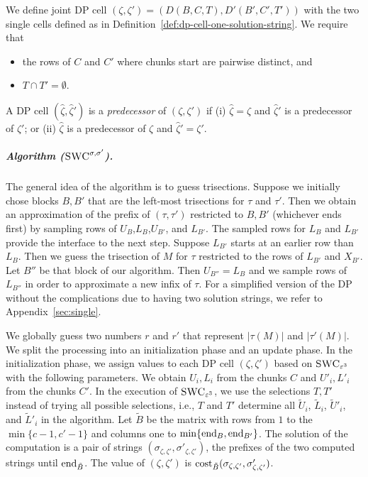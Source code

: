 \begin{definition}
    We define joint DP cell $(\zeta,\zeta') = (D(B,C,T), D'(B',C',T'))$ with the two single cells defined as in Definition~\ref{def:dp-cell-one-solution-string}. 
    We require that
    \begin{itemize}
        \item the rows of $C$ and $C'$ where chunks start are pairwise distinct, and
        \item $T \cap T' = \emptyset$.
    \end{itemize}
    \label{def:dp-cell-two-solution-string}
\end{definition}
\smallskip

\begin{definition}
    A DP cell $(\hat{\zeta}, \hat{\zeta}')$ is a \emph{predecessor} of $(\zeta, \zeta')$ if (i) $\hat{\zeta} = \zeta$ and $\hat{\zeta}'$ is a predecessor of $\zeta'$; or (ii) $\hat{\zeta}$ is a predecessor of $\zeta$ and $\hat{\zeta}' = \zeta'$.
    \label{def:predecessor-two}
\end{definition}

\subparagraph{Algorithm ($\textsc{SWC}^{\sigma, \sigma'}$).}
The general idea of the algorithm is to guess trisections.
Suppose we initially chose blocks $B,B'$ that are the left-most trisections for $\tau$ and $\tau'$.
Then we obtain an approximation of the prefix of $(\tau,\tau')$ restricted to $B,B'$ (whichever ends first) by sampling rows of $U_B$,$L_B$,$U_{B'}$, and $L_{B'}$.
The sampled rows for $L_B$ and $L_{B'}$ provide the interface to the next step.
Suppose $L_{B'}$ starts at an earlier row than $L_{B}$. 
Then we guess the trisection of $M$ for $\tau$ restricted to the rows of $L_{B'}$ and $X_{B'}$.
Let $B''$ be that block of our algorithm.
Then $U_{B''} = L_B$ and we sample rows of $L_{B''}$ in order to approximate a new infix of $\tau$.
For a simplified version of the DP without the complications due to having two solution strings, we refer to Appendix~\ref{sec:single}.

We globally guess two numbers $r$ and $r'$ that represent $|\tau(M)|$ and $|\tau'(M)|$.
We split the processing into an initialization phase and an update phase.
In the initialization phase, we assign values to each DP cell  $(\zeta,\zeta')$ based on $\textsc{SWC}_{\varepsilon^3}$ with the following parameters.
We obtain $U_i, L_i$ from the chunks $C$ and $U'_i,L'_i$ from the chunks $C'$.
In the execution of $\textsc{SWC}_{\varepsilon^3}$, we use the selections $T,T'$ instead of trying all possible selections, i.e., $T$ and $T'$ determine all $\tilde{U}_i$, $\tilde{L}_i$, $\tilde{U}'_i$, and $\tilde{L}'_i$ in the algorithm.
Let $\tilde{B}$ be the matrix with rows from $1$ to the $\min\{c - 1,c' - 1\}$ and columns one to $\min\{\textrm{end}_B, \textrm{end}_{B'}\}$.
The solution of the computation is a pair of strings $(\sigma_{\zeta,\zeta'},\sigma'_{\zeta,\zeta'})$, the prefixes of the two computed strings until $\textrm{end}_{\tilde{B}}$.
The value of $(\zeta,\zeta')$ is $\mathrm{cost}_{\tilde{B}}(\sigma_{\zeta,\zeta'},\sigma'_{\zeta,\zeta'})$.

